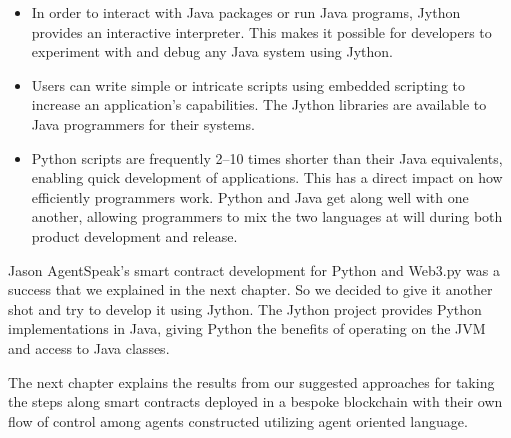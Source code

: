 \begin{itemize}
    \item In order to interact with Java packages or run Java programs, Jython provides an interactive interpreter. This makes it possible for developers to experiment with and debug any Java system using Jython.
    \vspace{.5cm}
    \item Users can write simple or intricate scripts using embedded scripting to increase an application's capabilities. The Jython libraries are available to Java programmers for their systems.
    \vspace{.5cm}
     \item Python scripts are frequently 2–10 times shorter than their Java equivalents, enabling quick development of applications. This has a direct impact on how efficiently programmers work. Python and Java get along well with one another, allowing programmers to mix the two languages at will during both product development and release.
\end{itemize}

\vspace{.5cm}

Jason AgentSpeak's smart contract development for Python and Web3.py was a success that we explained in the next chapter. So we decided to give it another shot and try to develop it using Jython. The Jython project provides Python implementations in Java, giving Python the benefits of operating on the JVM and access to Java classes.

\vspace{.5cm}

The next chapter explains the results from our suggested approaches for taking the steps along smart contracts deployed in a bespoke blockchain with their own flow of control among agents constructed utilizing agent oriented language.

